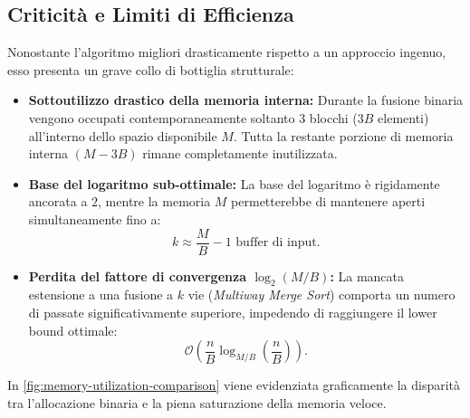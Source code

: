 \FloatBarrier
\subsection{Criticità e Limiti di Efficienza}
\label{subsec:suboptimality}

Nonostante l'algoritmo migliori drasticamente rispetto a un approccio ingenuo, esso presenta un grave collo di bottiglia strutturale:
\begin{itemize}
  \item \textbf{Sottoutilizzo drastico della memoria interna:} Durante la fusione binaria vengono occupati contemporaneamente soltanto $3$ blocchi ($3B$ elementi) all'interno dello spazio disponibile $M$. Tutta la restante porzione di memoria interna $(M - 3B)$ rimane completamente inutilizzata.
  \item \textbf{Base del logaritmo sub-ottimale:} La base del logaritmo è rigidamente ancorata a $2$, mentre la memoria $M$ permetterebbe di mantenere aperti simultaneamente fino a:
  \[
    k \approx \frac{M}{B} - 1 \text{ buffer di input}.
  \]
  \item \textbf{Perdita del fattore di convergenza $\log_2(M/B)$:} La mancata estensione a una fusione a $k$ vie (\textit{Multiway Merge Sort}) comporta un numero di passate significativamente superiore, impedendo di raggiungere il lower bound ottimale:
  \[
    \mathcal{O}\left(\frac{n}{B} \log_{M/B}\left(\frac{n}{B}\right)\right).
  \]
\end{itemize}

In \autoref{fig:memory-utilization-comparison} viene evidenziata graficamente la disparità tra l'allocazione binaria e la piena saturazione della memoria veloce.

